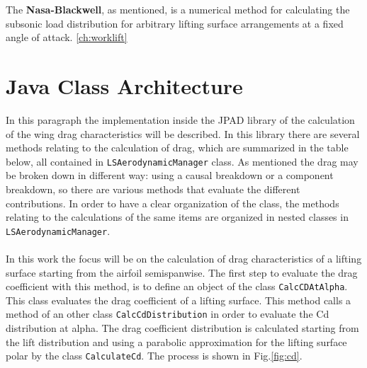 The {\bfseries Nasa-Blackwell}, as mentioned, is a numerical method for calculating the subsonic load distribution for arbitrary lifting surface arrangements at a fixed angle of attack. \ref{ch:worklift}


\section{Java Class Architecture}

In this paragraph the implementation inside the JPAD library of the calculation of the wing drag characteristics will be described. In this library there are several methods relating to the calculation of drag, which are summarized in the table below, all contained in \texttt{LSAerodynamicManager} class. As mentioned the drag may be broken down in different way: using a causal breakdown or a component breakdown, so there are various methods that evaluate the different contributions. In order to have a clear organization of the class, the methods relating to the calculations of the same items are organized in nested classes in  \texttt{LSAerodynamicManager}.\\ \\

In this work the focus will be on the calculation of drag characteristics of a lifting surface starting from the airfoil semispanwise. The first step to evaluate the drag coefficient with this method, is to define an object of the class  \texttt{CalcCDAtAlpha}. This class evaluates the drag coefficient of a lifting surface. This method calls  a method of an other class \texttt{CalcCdDistribution} in order to evaluate the Cd distribution at alpha. The drag coefficient distribution is calculated starting from the lift distribution and using a parabolic approximation for the lifting surface polar by the class \texttt{CalculateCd}. The process is shown in Fig.\ref{fig:cd}.


